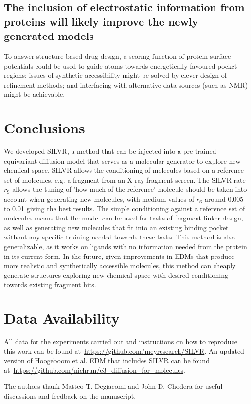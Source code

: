 \documentclass[journal=jacsat,manuscript=article]{achemso}
\begin{document}
\subsection{The inclusion of electrostatic information from proteins will likely improve the newly generated models}
To answer structure-based drug design, a scoring function of protein surface potentials could be used to guide atoms towards energetically favoured pocket regions; issues of synthetic accessibility might be solved by clever design of refinement methods; and interfacing with alternative data sources (such as NMR) might be achievable. 


\section{Conclusions}
We developed SILVR, a method that can be injected into a pre-trained equivariant diffusion model that serves as a molecular generator to explore new chemical space. SILVR allows the conditioning of molecules based on a reference set of molecules, e.g. a fragment from an X-ray fragment screen. The SILVR rate $r_{\mathrm{S}}$ allows the tuning of 'how much of the reference' molecule should be taken into account when generating new molecules, with medium values of $r_{\mathrm{S}}$ around 0.005 to 0.01 giving the best results. The simple conditioning against a reference set of molecules means that the model can be used for tasks of fragment linker design, as well as generating new molecules that fit into an existing binding pocket without any specific training needed towards these tasks. This method is also generalizable, as it works on ligands with no information needed from the protein in its current form. In the future, given improvements in EDMs that produce more realistic and synthetically accessible molecules, this method can cheaply generate structures exploring new chemical space with desired conditioning towards existing fragment hits.

\section{Data Availability}
All data for the experiments carried out and instructions on how to reproduce this work can be found at~\url{https://github.com/meyresearch/SILVR}. An updated version of Hoogeboom et al. EDM that includes SILVR can be found at~\url{https://github.com/nichrun/e3_diffusion_for_molecules}.

\begin{acknowledgement}
The authors thank Matteo T. Degiacomi and John D. Chodera for useful discussions and feedback on the manuscript. 
\end{acknowledgement}
\end{document}
